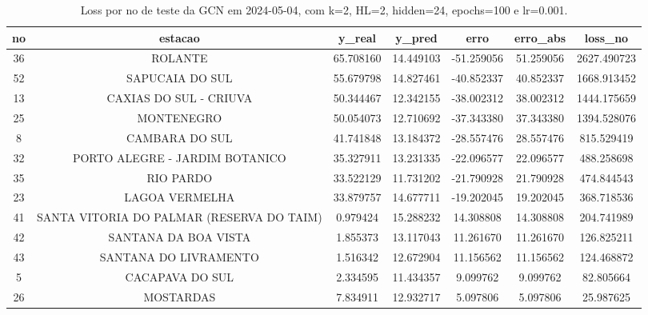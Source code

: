 \begin{table}[h]
\centering
\caption{Loss por no de teste da GCN em 2024-05-04, com k=2, HL=2, hidden=24, epochs=100 e lr=0.001.}
\label{tab:gcn_loss_k2_hl2_h24_e100_d20240504}
\begin{tabular}{ccccccc}
\toprule
no & estacao & y\_real & y\_pred & erro & erro\_abs & loss\_no \\
\midrule
36 & ROLANTE & 65.708160 & 14.449103 & -51.259056 & 51.259056 & 2627.490723 \\
52 & SAPUCAIA DO SUL & 55.679798 & 14.827461 & -40.852337 & 40.852337 & 1668.913452 \\
13 & CAXIAS DO SUL - CRIUVA & 50.344467 & 12.342155 & -38.002312 & 38.002312 & 1444.175659 \\
25 & MONTENEGRO & 50.054073 & 12.710692 & -37.343380 & 37.343380 & 1394.528076 \\
8 & CAMBARA DO SUL & 41.741848 & 13.184372 & -28.557476 & 28.557476 & 815.529419 \\
32 & PORTO ALEGRE - JARDIM BOTANICO & 35.327911 & 13.231335 & -22.096577 & 22.096577 & 488.258698 \\
35 & RIO PARDO & 33.522129 & 11.731202 & -21.790928 & 21.790928 & 474.844543 \\
23 & LAGOA VERMELHA & 33.879757 & 14.677711 & -19.202045 & 19.202045 & 368.718536 \\
41 & SANTA VITORIA DO PALMAR (RESERVA DO TAIM) & 0.979424 & 15.288232 & 14.308808 & 14.308808 & 204.741989 \\
42 & SANTANA DA BOA VISTA & 1.855373 & 13.117043 & 11.261670 & 11.261670 & 126.825211 \\
43 & SANTANA DO LIVRAMENTO & 1.516342 & 12.672904 & 11.156562 & 11.156562 & 124.468872 \\
5 & CACAPAVA DO SUL & 2.334595 & 11.434357 & 9.099762 & 9.099762 & 82.805664 \\
26 & MOSTARDAS & 7.834911 & 12.932717 & 5.097806 & 5.097806 & 25.987625 \\
\bottomrule
\end{tabular}
\end{table}
